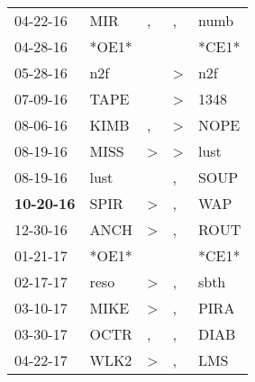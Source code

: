 \begin{supertabular}{p{0.07\textwidth}p{0.06\textwidth}p{0.02\textwidth}p{0.02\textwidth}p{0.06\textwidth}}
          04-22-16\textsuperscript{} &            MIR\textsuperscript{} &                , &                , &           numb\textsuperscript{} \\
          04-28-16\textsuperscript{} &                            *OE1* &                  &                  &                            *CE1* \\
          05-28-16\textsuperscript{} &            n2f\textsuperscript{} &                  &     \textgreater &            n2f\textsuperscript{} \\
          07-09-16\textsuperscript{} &           TAPE\textsuperscript{} &                  &     \textgreater &           1348\textsuperscript{} \\
          08-06-16\textsuperscript{} &           KIMB\textsuperscript{} &                , &     \textgreater &           NOPE\textsuperscript{} \\
          08-19-16\textsuperscript{} &           MISS\textsuperscript{} &     \textgreater &     \textgreater &           lust\textsuperscript{} \\
          08-19-16\textsuperscript{} &           lust\textsuperscript{} &                  &                , &           SOUP\textsuperscript{} \\
 \textbf{10-20-16\textsuperscript{}} &           SPIR\textsuperscript{} &     \textgreater &                , &            WAP\textsuperscript{} \\
          12-30-16\textsuperscript{} &           ANCH\textsuperscript{} &     \textgreater &                , &           ROUT\textsuperscript{} \\
          01-21-17\textsuperscript{} &                            *OE1* &                  &                  &                            *CE1* \\
          02-17-17\textsuperscript{} &           reso\textsuperscript{} &     \textgreater &                , &           sbth\textsuperscript{} \\
          03-10-17\textsuperscript{} &           MIKE\textsuperscript{} &     \textgreater &                , &           PIRA\textsuperscript{} \\
          03-30-17\textsuperscript{} &           OCTR\textsuperscript{} &                , &                , &           DIAB\textsuperscript{} \\
          04-22-17\textsuperscript{} &           WLK2\textsuperscript{} &     \textgreater &                , &            LMS\textsuperscript{} \\

\end{supertabular}
